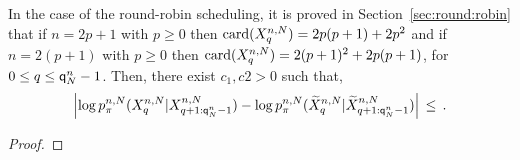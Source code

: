 \begin{remark}
\label{rem:forgetting:tildeX}
In the case of the round-robin scheduling, it is proved in Section~\ref{sec:round:robin} that if  $n = 2p+1$ with $p\ge 0$ then $\mathrm{card}(X^{n,N}_{q}) = 2p(p+1) + 2p^2$ and  if  $n = 2(p+1)$ with $p\ge 0$ then $\mathrm{card}(X^{n,N}_{q}) = 2(p+1)^2 + 2p(p+1)$, for $0 \le q\le {\mathsf{q}}^{n}_{N}-1$. Then, there exist $c_1,c2 >0$ such that,
\[
\left|\log p_{\pi}^{n,N}(X_{q}^{n,N}|X_{q+1:{\mathsf{q}}^{n}_{N}-1}^{n,N}) - \log p_{\pi}^{n,N}(\widetilde{X}_{q}^{n,N}|\widetilde{X}_{q+1:{\mathsf{q}}^{n}_{N}-1}^{n,N})\right| \\
\leq \,.
\]
\end{remark}

\begin{proof}

\end{proof}





